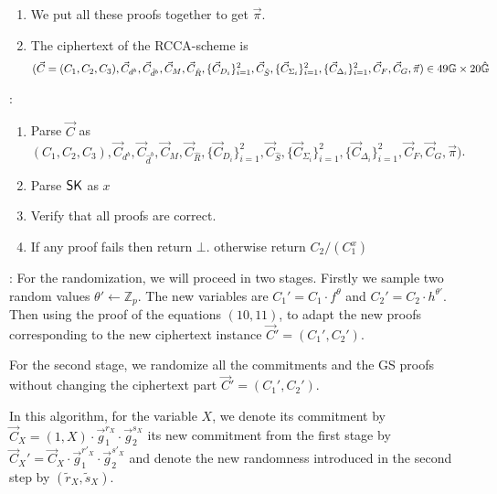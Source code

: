\begin{description}
\begin{enumerate}
    
  \item We put all these proofs together to get $\vec{\pi}$.
  \item The ciphertext of the RCCA-scheme is
    $$(\vec{C} = (C_1, C_2, C_3), \vec{C}_{d^b}, \vec{C}_{\hat{d}^b}, \vec{C}_{M}, \vec{C}_{\hat{R}}, \{\vec{C}_{D_i}\}_{i = 1}^2, \vec{C}_{\hat{S}}, \{\vec{C}_{\Sigma_i}\}_{i = 1}^2,\{\vec{C}_{\Delta_i}\}_{i=1}^2, \vec{C}_F, \vec{C}_G, \vec{\pi}) \in 49\mathbb{G} \times 20 \hat{\mathbb{G}}$$
    
  \end{enumerate}

\item[\boldmath{$RCCA3.\Dec(\PK,\SK, \vec{C})$}]:
  \begin{enumerate}
  \item Parse $\vec{C}$ as $(C_1, C_2, C_3), \vec{C}_{d^b}, \vec{C}_{\hat{d}^b}, \vec{C}_{M}, \vec{C}_{\hat{R}}, \{\vec{C}_{D_i}\}_{i = 1}^2, \vec{C}_{\hat{S}}, \{\vec{C}_{\Sigma_i}\}_{i = 1}^2,\{\vec{C}_{\Delta_i}\}_{i=1}^2, \vec{C}_F, \vec{C}_G, \vec{\pi})$.
  \item Parse $\mathsf{SK}$ as $x$
  \item Verify that all proofs are correct.
  \item If any proof fails then return $\bot$. otherwise return $C_2/(C_1^x)$ 
  \end{enumerate}

\item[\boldmath{$RCCA3.\Rerand(\PK, \vec{C}, )$}]:  
  For the randomization, we will proceed in two stages. Firstly we sample two random values $\theta' \gets \mathbb{Z}_p$. The new variables are $C_1' = C_1 \cdot f^{\theta}$ and $C_2' = C_2 \cdot h^{\theta'}$. Then using the proof of the equations $(10, 11)$, to adapt the new proofs corresponding to the new ciphertext instance $\vec{C}' = (C_1', C_2')$.

  
For the second stage, we randomize all the commitments and the GS proofs without changing the ciphertext part $\vec{C}' = (C_1', C_2')$.

In this algorithm, for the variable $X$, we denote its commitment by $\vec{C}_X = (1, X) \cdot \vec{g}_1^{r_X} \cdot \vec{g}_2^{s_X}$ its new commitment from the first stage by $\vec{C}_X' = \vec{C}_X \cdot \vec{g}_1^{r'_X} \cdot \vec{g}_2^{s'_X}$ and denote the new randomness introduced in the second step by $(\tilde{r}_X, \tilde{s}_X)$.



\end{description}


%

